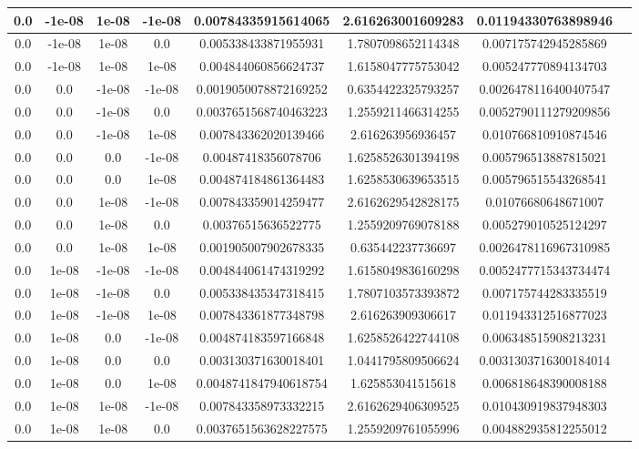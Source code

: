 \documentclass[a4paper]{article}
\begin{document}
\begin{center}
\begin{longtable}{@{}c|@{}c|@{}c|@{}c|@{}c|@{}c|@{}cX@{}}
		0.0 & -1e-08 & 1e-08 & -1e-08 & 0.00784335915614065& 2.616263001609283& 0.01194330763898946\\ \hline
		0.0 & -1e-08 & 1e-08 & 0.0& 0.005338433871955931& 1.7807098652114348& 0.007175742945285869\\ \hline
		0.0 & -1e-08 & 1e-08 & 1e-08 & 0.004844060856624737& 1.6158047775753042& 0.005247770894134703\\ \hline
		0.0 & 0.0 & -1e-08 & -1e-08 & 0.0019050078872169252& 0.6354422325793257& 0.0026478116400407547\\ \hline
		0.0 & 0.0 & -1e-08 & 0.0& 0.0037651568740463223& 1.2559211466314255& 0.0052790111279209856\\ \hline
		0.0 & 0.0 & -1e-08 & 1e-08 & 0.007843362020139466& 2.616263956936457& 0.010766810910874546\\ \hline
		0.0 & 0.0 & 0.0 & -1e-08 & 0.00487418356078706& 1.6258526301394198& 0.005796513887815021\\ \hline
		0.0 & 0.0 & 0.0 & 1e-08 & 0.004874184861364483& 1.6258530639653515& 0.005796515543268541\\ \hline
		0.0 & 0.0 & 1e-08 & -1e-08 & 0.007843359014259477& 2.6162629542828175& 0.01076680648671007\\ \hline
		0.0 & 0.0 & 1e-08 & 0.0& 0.00376515636522775& 1.2559209769078188& 0.005279010525124297\\ \hline
		0.0 & 0.0 & 1e-08 & 1e-08 & 0.001905007902678335& 0.635442237736697& 0.0026478116967310985\\ \hline
		0.0 & 1e-08 & -1e-08 & -1e-08 & 0.004844061474319292& 1.6158049836160298& 0.0052477715343734474\\ \hline
		0.0 & 1e-08 & -1e-08 & 0.0& 0.005338435347318415& 1.7807103573393872& 0.007175744283335519\\ \hline
		0.0 & 1e-08 & -1e-08 & 1e-08 & 0.007843361877348798& 2.616263909306617& 0.011943312516877023\\ \hline
		0.0 & 1e-08 & 0.0 & -1e-08 & 0.004874183597166848& 1.6258526422744108& 0.006348515908213231\\ \hline
		0.0 & 1e-08 & 0.0 & 0.0& 0.003130371630018401& 1.0441795809506624& 0.0031303716300184014\\ \hline
		0.0 & 1e-08 & 0.0 & 1e-08 & 0.0048741847940618754& 1.625853041515618& 0.006818648390008188\\ \hline
		0.0 & 1e-08 & 1e-08 & -1e-08 & 0.007843358973332215& 2.6162629406309525& 0.010430919837948303\\ \hline
		0.0 & 1e-08 & 1e-08 & 0.0& 0.0037651563628227575& 1.2559209761055996& 0.004882935812255012\\ \hline

\end{longtable}
\end{center}
\end{document}
